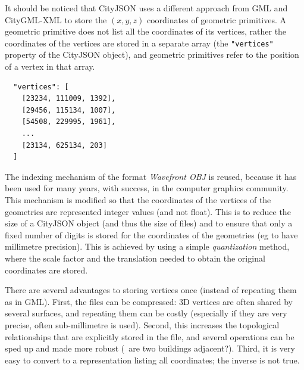 It should be noticed that CityJSON uses a different approach from GML and CityGML-XML to store the $(x,y,z)$ coordinates of geometric primitives.
A geometric primitive does not list all the coordinates of its vertices, rather the coordinates of the vertices are stored in a separate array (the \texttt{"vertices"} property of the CityJSON object), and geometric primitives refer to the position of a vertex in that array.
\begin{lstlisting}
  "vertices": [
    [23234, 111009, 1392],
    [29456, 115134, 1007],
    [54508, 229995, 1961],
    ...
    [23134, 625134, 203]
  ]
\end{lstlisting}
The indexing mechanism of the format \emph{Wavefront OBJ} is reused, because it has been used for many years, with success, in the computer graphics community.
This mechanism is modified so that the coordinates of the vertices of the geometries are represented integer values (and not float).
This is to reduce the size of a CityJSON object (and thus the size of files) and to ensure that only a fixed number of digits is stored for the coordinates of the geometries (eg to have millimetre precision).
This is achieved by using a simple \emph{quantization} method, 
where the scale factor and the translation needed to obtain the original coordinates are stored.

There are several advantages to storing vertices once (instead of repeating them as in GML).
First, the files can be compressed: 3D vertices are often shared by several surfaces, and repeating them can be costly (especially if they are very precise, often sub-millimetre is used).
Second, this increases the topological relationships that are explicitly stored in the file, and several operations can be sped up and made more robust (\eg\ are two buildings adjacent?).
Third, it is very easy to convert to a representation listing all coordinates; the inverse is not true. 

%

